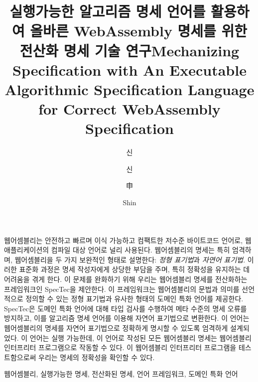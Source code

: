 \documentclass[master,english,draft]{kaist-ucs} %
\title[korean] {실행가능한 알고리즘 명세 언어를 활용하여 올바른 WebAssembly 명세를 위한 전산화 명세 기술 연구}
\title[english]{Mechanizing Specification with An Executable Algorithmic Specification Language for Correct WebAssembly Specification}
\author[korean] {신}{원 호}
\author[korean2] {신}{원호}    %
\author[chinese]{申}{元 鎬}
\author[english]{Shin}{Wonho}
\begin{document}

 \thesisinfo
  \begin{summary}
  웹어셈블리는 안전하고 빠르며 이식 가능하고 컴팩트한 저수준 바이트코드
  언어로, 웹 애플리케이션의 컴파일 대상 언어로 널리 사용된다.
  웹어셈블리의 명세는 특히 엄격하며, 웹어셈블리을 두 가지 보완적인 형태로 설명한다:
  \textit{정형 표기법}과 \textit{자연어 표기법}.
  이러한 표준화 과정은 명세 작성자에게 상당한 부담을 주며, 특히 정확성을
  유지하는 데 어려움을 겪게 한다.
  이 문제를 완화하기 위해 우리는 웹어셈블리 명세를 전산화하는 프레임워크인 SpecTec을
  제안한다.
  이 프레임워크는 웹어셈블리의 문법과 의미를 선언적으로 정의할 수 있는 정형 표기법과
  유사한 형태의 도메인 특화 언어를 제공한다.
  SpecTec은 도메인 특화 언어에 대해 타입 검사를 수행하여 메타 수준의 명세 오류를 방지하고,
  이를 알고리즘 명세 언어를 이용해 자연어 표기법으로 변환한다.
  이 언어는 웹어셈블리의 명세를 자연어 표기법으로 정확하게 명시할 수 있도록 엄격하게
  설계되었다.
  이 언어는 실행 가능한데, 이 언어로 작성된 모든 웹어셈블리 명세는 웹어셈블리 인터프리터
  프로그램으로 작동할 수 있다.
  이 웹어셈블리 인터프리터 프로그램을 테스트함으로써 우리는 명세의 정확성을 확인할 수
  있다.
  \end{summary}

  \begin{Korkeyword}
  웹어셈블리, 실행가능한 명세, 전산화된 명세, 언어 프레임워크, 도메인 특화 언어
  \end{Korkeyword}
\end{document}
